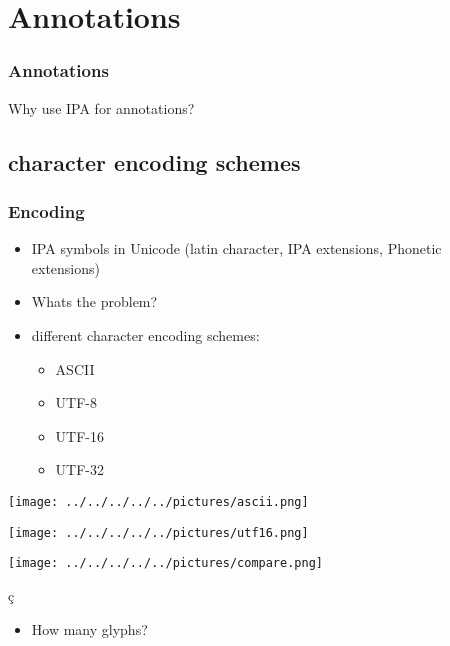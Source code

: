 \documentclass[12pt,a4paper]{beamer}
\begin{document}
\section{Annotations}
\begin{frame}
    \frametitle{Annotations}
    \centering
    \begin{Large}
        Why use IPA for annotations?
    \end{Large}
\end{frame}

\subsection{character encoding schemes}
\begin{frame}
    \frametitle{Encoding}
    \begin{itemize}
        \item IPA symbols in Unicode (latin character, IPA extensions, Phonetic extensions)
        \item Whats the problem?
        \item different character encoding schemes:
        \begin{itemize}
            \item ASCII
            \item UTF-8
            \item UTF-16
            \item UTF-32
        \end{itemize}
    \end{itemize}
\end{frame}

\begin{frame}
    \centering
    \texttt{[image: ../../../../../pictures/ascii.png]}
\end{frame}

\begin{frame}
    \centering
    \texttt{[image: ../../../../../pictures/utf16.png]}
\end{frame}

\begin{frame}
    \centering
    \texttt{[image: ../../../../../pictures/compare.png]}
\end{frame}

\begin{frame}
    \begin{center}
        {\LARGE \c{c}}
    \end{center}
    \begin{itemize}
        \item How many glyphs?
    \end{itemize}
\end{frame}
\end{document}
